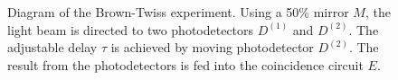 \begin{figure}
\centering



\caption{Diagram of the Brown-Twiss experiment. Using a 50\% mirror $M$, the light beam is directed to two photodetectors $D^{(1)}$ and $D^{(2)}$. The adjustable delay $\tau$ is achieved by moving photodetector $D^{(2)}$. The result from the photodetectors is fed into the coincidence circuit $E$.}
\label{figPart3Nonclass2}
\end{figure}